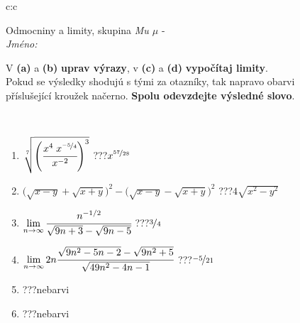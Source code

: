 \documentclass[10pt]{report}
\begin{document}
\newpage
\thispagestyle{empty}
\begin{tabular}{c:c}
\begin{minipage}[c][104.5mm][t]{0.5\linewidth}
\begin{center}
\vspace{7mm}
{\huge Odmocniny a limity, skupina \textit{Mu $\mu$} -}\\[5mm]
\textit{Jméno:}\phantom{xxxxxxxxxxxxxxxxxxxxxxxxxxxxxxxxxxxxxxxxxxxxxxxxxxxxxxxxxxxxxxxxx}\\[5mm]
\begin{minipage}{0.95\linewidth}
\begin{center}
V \textbf{(a)} a \textbf{(b)} \textbf{uprav výrazy}, v \textbf{(c)} a \textbf{(d)} \textbf{vypočítaj limity}.\\Pokud se výsledky shodujú s tými za otazníky, tak napravo obarvi\\příslušející kroužek načerno. \textbf{Spolu odevzdejte výsledné slovo}.
\end{center}
\end{minipage}
\\[1mm]
\begin{minipage}{0.79\linewidth}
\begin{center}
\begin{varwidth}{\linewidth}
\begin{enumerate}
\small
\item $\sqrt[7]{\left(\cfrac{x^{4}\;x^{\nicefrac{-5}{4}}}{x^{-2}}\right)^{3}}$\quad \dotfill\; ???\;\dotfill \quad $x^{\nicefrac{57}{28}}$
\item {\footnotesize{\scriptsize$\big(\sqrt{x-y}+\sqrt{x+y}\big)^2-\big(\sqrt{x-y}-\sqrt{x+y}\big)^2$}\quad \dotfill\; ???\;\dotfill \quad $4\sqrt{x^2-y^2}$}
\item $\lim\limits_{n\to\infty}\cfrac{n^{-1/2}}{\sqrt{9n+3}-\sqrt{9n-5}}$\quad \dotfill\; ???\;\dotfill \quad $\nicefrac{3}{4}$
\item $\lim\limits_{n\to\infty}2n\cfrac{\sqrt{9n^2-5n-2}-\sqrt{9n^2+5}}{\sqrt{49n^2-4n-1}}$\quad \dotfill\; ???\;\dotfill \quad $\nicefrac{-5}{21}$
\item \quad \dotfill\; ???\;\dotfill \quad nebarvi
\item \quad \dotfill\; ???\;\dotfill \quad nebarvi
\end{enumerate}
\end{varwidth}
\end{center}
\end{minipage}
\begin{minipage}{0.20\linewidth}

\end{minipage}
\end{center}
\end{minipage}
\end{tabular}
\end{document}
